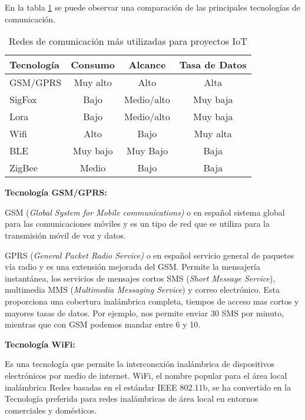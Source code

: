 En la tabla \ref{tab:Tecno} se puede observar una comparación de las principales tecnologías de comunicación.

\begin{table}[h]
	\centering
	\caption[Redes de comunicación]{Redes de comunicación más utilizadas para proyectos IoT}
	\begin{tabular}{l c c c}    
		\toprule
		\textbf{Tecnología} 	 & \textbf{Consumo}  & \textbf{Alcance} 	& \textbf{Tasa de Datos} \\
		\midrule
		GSM/GPRS				 & Muy alto			& Alto					&	Alta \\		
		SigFox					 & Bajo				& Medio/alto			&	Muy baja \\
		Lora					 & Bajo				& Medio/alto			&	Muy baja\\	
		Wifi					 & Alto				& Bajo					&	Muy alta \\
		BLE					 	 & Muy bajo			& Muy Bajo				&	Baja \\
		ZigBee					 & Medio			& Bajo					&	Baja \\	
		\bottomrule
		\hline
	\end{tabular}
	\label{tab:Tecno}
\end{table}

\textbf{Tecnología GSM/GPRS:}

GSM (\textit{Global System for Mobile communications)} o en español sistema global para las comunicaciones móviles y es un tipo de red que se utiliza para la transmisión móvil de voz y datos.

GPRS (\textit{General Packet Radio Service)} o en español servicio general de paquetes vía radio y es una extensión mejorada del GSM.
Permite la mensajería instantánea, los servicios de mensajes cortos SMS (\textit{Short Message Service}), multimedia MMS (\textit{Multimedia Messaging Service}) y correo electrónico. Esta proporciona una cobertura inalámbrica completa, tiempos de acceso mas cortos y mayores tasas de datos\citep{bettstetter1999gsm}. Por ejemplo, nos permite enviar 30 SMS por minuto, mientras que con GSM podemos mandar entre 6 y 10.

\textbf{Tecnología WiFi:}

Es una tecnología que permite la interconexión inalámbrica de dispositivos electrónicos por medio de internet. WiFi, el nombre popular para el área local inalámbrica Redes basadas en el estándar IEEE 802.11b, se ha convertido en la Tecnología preferida para redes inalámbricas de área local en entornos comerciales y domésticos\citep{henry2002wifi}.

